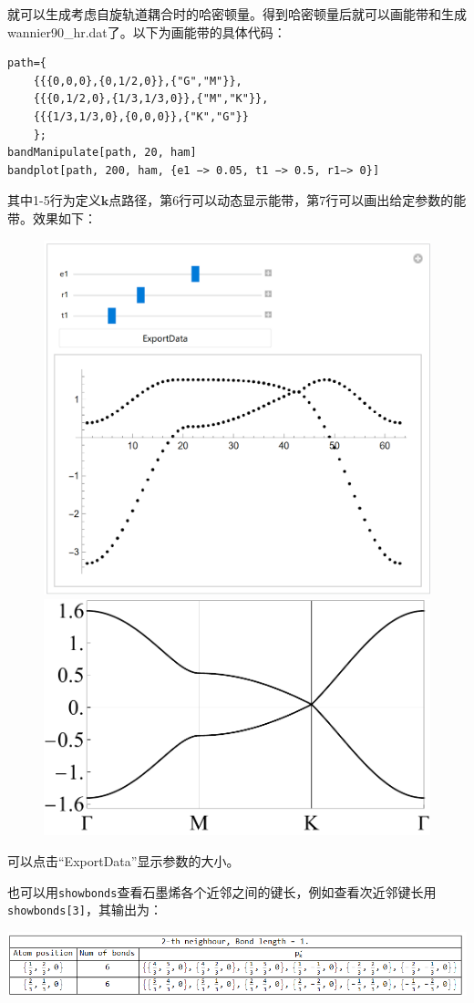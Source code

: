\documentclass[titlepage,a4paper,12pt,AutoFakeBold]{article}
\begin{document}
就可以生成考虑自旋轨道耦合时的哈密顿量。得到哈密顿量后就可以画能带和生成wannier90\_hr.dat了。以下为画能带的具体代码：
\begin{lstlisting}
path={
	{{{0,0,0},{0,1/2,0}},{"G","M"}},
	{{{0,1/2,0},{1/3,1/3,0}},{"M","K"}},
	{{{1/3,1/3,0},{0,0,0}},{"K","G"}}
	};
bandManipulate[path, 20, ham]
bandplot[path, 200, ham, {e1 −> 0.05, t1 −> 0.5, r1−> 0}]
\end{lstlisting}
其中1-5行为定义$\boldsymbol{k}$点路径，第6行可以动态显示能带，第7行可以画出给定参数的能带。效果如下：
\begin{figure}[H]
	\includegraphics[width=.45\textwidth]{./figures/bm}
	\includegraphics[width=.54\textwidth]{./figures/grabd}
\end{figure}
\noindent 可以点击“ExportData”显示参数的大小。


也可以用\lstinline|showbonds|查看石墨烯各个近邻之间的键长，例如查看次近邻键长用
\lstinline|showbonds[3]|，其输出为：
\begin{center}
\includegraphics[width=1.0\textwidth]{./figures/showbonds.png}
\end{center}
\end{document}
